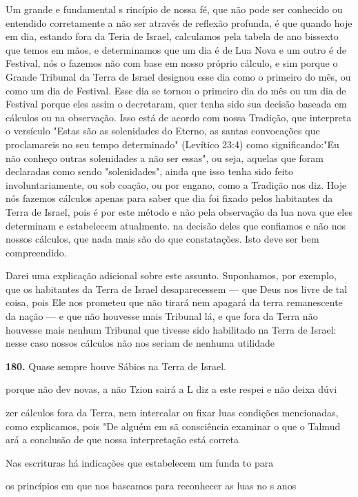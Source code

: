 \begin{itemize}
\begin{enumrate}
\begin{itemize}
\begin{itemize}
\begin{itemize}
Um grande e fundamental s rincípio de nossa fé, que não pode ser
conhecido ou entendido corretamente a não ser através de reflexão
profunda, é que quando hoje em dia, estando fora da Teria de Israel,
calculamos pela ta­bela de ano bissexto que temos em mãos, e
determinamos que um dia é de Lua Nova e um outro é de Festival, nós o
fazemos não com base em nosso próprio cálculo, e sim porque o Grande
Tribunal da Terra de Israel designou esse dia como o primeiro do mês, ou
como um dia de Festival. Esse dia se tornou o primeiro dia do mês ou um
dia de Festival porque eles assim o decretaram, quer tenha sido sua
decisão baseada em cálculos ou na observação. Isso está de acordo com
nossa Tradição, que interpreta o versículo "Estas são as solenidades do
Eterno, as santas convocações que proclamareis no seu tempo determinado"
(Levítico 23:4) como significando:"Eu não conheço outras solenidades a
não ser essas", ou seja, aquelas que foram declaradas como sendo
"solenidades", ainda que isso tenha sido feito involuntariamente, ou sob
coação, ou por enga­no, como a Tradição nos diz. Hoje nós fazemos
cálculos apenas para saber que dia foi fixado pelos habitantes da Terra
de Israel, pois é por este método e não pela observação da lua nova que
eles determinam e estabelecem atualmente.
 na decisão deles que confiamos e não nos nossos cálculos, que nada
 mais são do que constatações. Isto deve ser bem compreendido.


Darei uma explicação adicional sobre este assunto. Suponhamos, por
exemplo, que os habitantes da Terra de Israel desaparecessem --- que
Deus nos livre de tal coisa, pois Ele nos prometeu que não tirará nem
apagará da terra
 remanescente da nação --- e que não houvesse mais Tribunal lá, e que
 fora da Terra não houvesse mais nenhum Tribunal que tivesse sido
 habilitado na Terra de Israel: nesse caso nossos cálculos não nos
 seriam de nenhuma utilidade


\textbf{180.} Quase sempre houve Sábios na Terra de Israel.


porque não dev novas, a não Tzion sairá a L diz a este respei e não
deixa dúvi

zer cálculos fora da Terra, nem intercalar ou fixar luas condições
mencionadas, como explicamos, pois "De alguém em sã consciência examinar
o que o Talmud ará a conclusão de que nossa interpretação está correta


Nas escrituras há indicações que estabelecem um funda to para

os princípios em que nos baseamos para reconhecer as luas no s anos


\end{itemize}
\end{itemize}
\end{itemize}
\end{enumrate}
\end{itemize}

